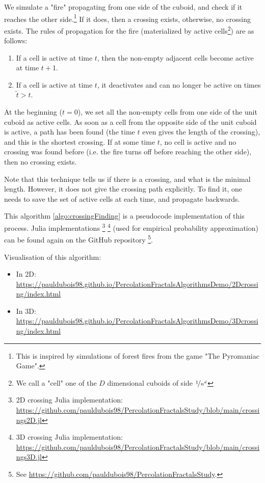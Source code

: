 We simulate a "fire" propagating from one side of the cuboid, and check if it reaches the other side.\footnote{This is inspired by simulations of forest fires from the game "The Pyromaniac Game"\cite{pyromaniacGame}.}
If it does, then a crossing exists, otherwise, no crossing exists.
The rules of propagation for the fire (materialized by active cells\footnote{We call a "cell" one of the $D$ dimensional cuboids of side $\nicefrac{1}{n^d}$}) are as follows:
\begin{enumerate}
	\item If a cell is active at time $t$, then the non-empty adjacent cells become active at time $t+1$.
	\item If a cell is active at time $t$, it deactivates and can no longer be active on times $\tilde{t}>t$.
\end{enumerate}
At the beginning ($t=0$), we set all the non-empty cells from one side of the unit cuboid as active cells.
As soon as a cell from the opposite side of the unit cuboid is active, a path has been found (the time $t$ even gives the length of the crossing), and this is the shortest crossing.
If at some time $t$, no cell is active and no crossing was found before (i.e. the fire turns off before reaching the other side), then no crossing exists.

Note that this technique tells us if there is a crossing, and what is the minimal length. However, it does not give the crossing path explicitly.
To find it, one needs to save the set of active cells at each time, and propagate backwards.

This algorithm \ref{algo:crossingFinding} is a pseudocode implementation of this process.
Julia implementations
\footnote{2D crossing Julia implementation: \url{https://github.com/pauldubois98/PercolationFractalsStudy/blob/main/crossings2D.jl}}
\footnote{3D crossing Julia implementation: \url{https://github.com/pauldubois98/PercolationFractalsStudy/blob/main/crossings3D.jl}}
(used for empirical probability approximation) can be found again on the GitHub repository
\footnote{See \url{https://github.com/pauldubois98/PercolationFractalsStudy}.}.

Visualisation of this algorithm:
\begin{itemize}
	\item In 2D: \url{https://pauldubois98.github.io/PercolationFractalsAlgorithmsDemo/2Dcrossing/index.html}
	\item In 3D: \url{https://pauldubois98.github.io/PercolationFractalsAlgorithmsDemo/3Dcrossing/index.html}
\end{itemize}

